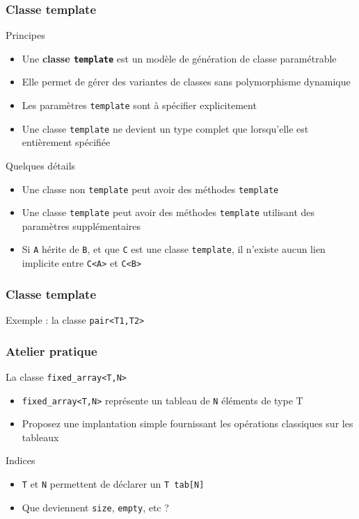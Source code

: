 \documentclass[svgnames]{beamer}
\begin{document}
\frame
{
  \frametitle{Classe template}
  \begin{block}{Principes}
  \begin{itemize}
  \footnotesize
  \item Une \textbf{classe \texttt{template}} est un modèle de génération de classe paramétrable
  \item Elle permet de gérer des variantes de classes sans polymorphisme dynamique
  \item Les paramètres \texttt{template} sont à spécifier explicitement
  \item Une classe \texttt{template} ne devient un type complet que
    lorsqu'elle est entièrement spécifiée
  \end{itemize}
  \end{block}

  \begin{block}{Quelques détails}
  \begin{itemize}
  \footnotesize
  \item Une classe non \texttt{template} peut avoir des méthodes \texttt{template}
  \item Une classe \texttt{template} peut avoir des méthodes
    \texttt{template} utilisant des paramètres supplémentaires
  \item Si \texttt{A} hérite de \texttt{B}, et que \texttt{C} est une
    classe \texttt{template}, il n'existe aucun lien implicite
    entre \texttt{C<A>} et \texttt{C<B>}
  \end{itemize}
  \end{block}
}

\frame
{
  \frametitle{Classe template}
  \begin{block}{Exemple : la classe \texttt{pair<T1,T2>}}
  \bigskip
  \lsttmppair
  \end{block}
}

\frame
{
  \frametitle{Atelier pratique}
  \begin{block}{La classe \texttt{fixed\_array<T,N>}}
  \begin{itemize}
  \item \texttt{fixed\_array<T,N>} représente un tableau de \texttt{N} éléments de type T
  \item Proposez une implantation simple fournissant les opérations classiques sur les tableaux
  \end{itemize}
  \end{block}

  \begin{block}{Indices}
  \begin{itemize}
  \item \texttt{T} et \texttt{N} permettent de déclarer un \texttt{T tab[N]}
  \item Que deviennent \texttt{size}, \texttt{empty}, etc ?
  \end{itemize}
  \end{block}
}
\end{document}
